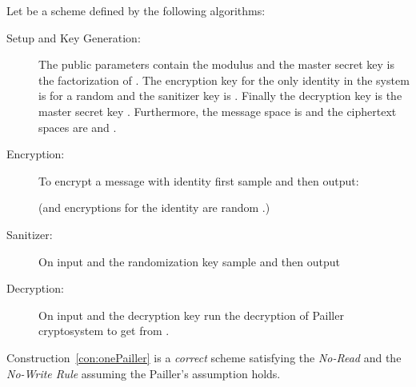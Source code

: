 \documentclass{llncs}
\begin{document}
\begin{construction} \label{con:onePailler} Let  be a \oACE scheme defined by the following algorithms:
\end{construction}
\begin{description}
\item[Setup and Key Generation:] The public parameters  contain the modulus  and the master secret key  is the factorization of . The encryption key for the only identity in the system is  for a random  and the sanitizer key is . Finally the decryption key  is the master secret key .
Furthermore, the message space is  and the ciphertext spaces are  and .

\item[Encryption:] To encrypt a message  with identity  first sample  and then output:


(and encryptions for the identity  are random .)

\item[Sanitizer:] On input  and the randomization key  sample  and then output 


\item[Decryption:] On input  and the decryption key run the decryption of Pailler cryptosystem to get  from . 
\end{description}


\begin{lem} Construction~\ref{con:onePailler} is a \emph{correct} \oACE scheme satisfying the \emph{No-Read} and the \emph{No-Write Rule} assuming the Pailler's assumption holds.
\end{lem}
\end{document}
